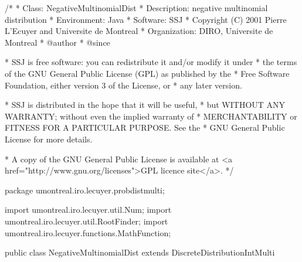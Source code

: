 \begin{code}
\begin{hide}
/*
 * Class:        NegativeMultinomialDist
 * Description:  negative multinomial distribution
 * Environment:  Java
 * Software:     SSJ
 * Copyright (C) 2001  Pierre L'Ecuyer and Universite de Montreal
 * Organization: DIRO, Universite de Montreal
 * @author
 * @since

 * SSJ is free software: you can redistribute it and/or modify it under
 * the terms of the GNU General Public License (GPL) as published by the
 * Free Software Foundation, either version 3 of the License, or
 * any later version.

 * SSJ is distributed in the hope that it will be useful,
 * but WITHOUT ANY WARRANTY; without even the implied warranty of
 * MERCHANTABILITY or FITNESS FOR A PARTICULAR PURPOSE.  See the
 * GNU General Public License for more details.

 * A copy of the GNU General Public License is available at
   <a href="http://www.gnu.org/licenses">GPL licence site</a>.
 */
\end{hide}
package umontreal.iro.lecuyer.probdistmulti;
\begin{hide}
import umontreal.iro.lecuyer.util.Num;
import umontreal.iro.lecuyer.util.RootFinder;
import umontreal.iro.lecuyer.functions.MathFunction;
\end{hide}

public class NegativeMultinomialDist extends DiscreteDistributionIntMulti \begin{hide} {
   protected double n;
   protected double p[];

   private static class Function implements MathFunction {
      protected double Fl[];
      protected int ups[];
      protected int k;
      protected int M;
      protected int sumUps;

      public Function (int k, int m, int ups[], double Fl[]) {
         this.k = k;
         this.M = m;

         this.Fl = new double[Fl.length];
         System.arraycopy (Fl, 0, this.Fl, 0, Fl.length);
         this.ups = new int[ups.length];
         System.arraycopy (ups, 0, this.ups, 0, ups.length);

         sumUps = 0;
         for (int i = 0; i < ups.length; i++)
            sumUps += ups[i];
      }

      public double evaluate (double gamma) {
         double sum = 0.0;
         for (int l = 0; l < M; l++)
            sum += (Fl[l] / (gamma + (double) l));
         return (sum - Math.log1p (sumUps / (k * gamma)));
      }
   }


   private static class FuncInv extends Function implements MathFunction {

      public FuncInv (int k, int m, int ups[], double Fl[]) {
         super (k, m, ups, Fl);
      }

      public double evaluate (double nu) {
         double sum = 0.0;
         for (int l = 0; l < M; l++)
            sum += Fl[l] / (1.0 + nu * l);
         return (sum *nu - Math.log1p (sumUps * nu / k));
      }
   }
\end{hide}
\end{code}
